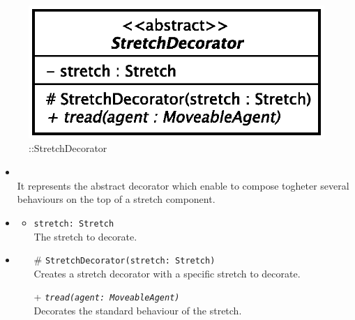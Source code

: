 \begin{figure}[h]
\centering
\includegraphics[scale=0.6,keepaspectratio]{images/solution/app/backend/stretch_decorator.eps}
\caption{\pReactiveComponentStretchDecoration::StretchDecorator}
\label{fig:sd-app-stretch_decorator}
\end{figure}
\FloatBarrier
\begin{itemize}
  \item \textbf{\descr} \\
    It represents the abstract decorator which enable to compose togheter several
behaviours on the top of a stretch component. 
  \item \textbf{\attrs}
  \begin{itemize}
    \item \texttt{stretch: Stretch} \\
The stretch to decorate.
  \end{itemize}
  \item \textbf{\ops}
   \begin{itemize} 
   \item[\#] \texttt{StretchDecorator(stretch: Stretch)} \\
Creates a stretch decorator with a specific stretch to decorate.
    \item[+] \texttt{\textit{tread(agent: MoveableAgent)}} \\
Decorates the standard behaviour of the stretch.  
  \end{itemize}
\end{itemize}
